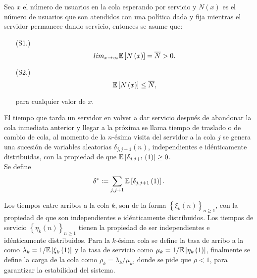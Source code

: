 Sea $x$ el n\'umero de usuarios en la cola esperando por servicio
y $N\left(x\right)$ es el n\'umero de usuarios que son atendidos
con una pol\'itica dada y fija mientras el servidor permanece
dando servicio, entonces se asume que:
\begin{itemize}
\item[(S1.)]
\begin{equation}\label{S1}
lim_{x\rightarrow\infty}\mathbb{E}\left[N\left(x\right)\right]=\overline{N}>0.
\end{equation}
\item[(S2.)]
\begin{equation}\label{S2}
\mathbb{E}\left[N\left(x\right)\right]\leq \overline{N},
\end{equation}

para cualquier valor de $x$.
\end{itemize}

El tiempo que tarda un servidor en volver a dar servicio despu\'es
de abandonar la cola inmediata anterior y llegar a la pr\'oxima se
llama tiempo de traslado o de cambio  de cola, al momento de la
$n$-\'esima visita del servidor a la cola $j$ se genera una
sucesi\'on de variables aleatorias $\delta_{j,j+1}\left(n\right)$,
independientes e id\'enticamente distribuidas, con la propiedad de
que $\mathbb{E}\left[\delta_{j,j+1}\left(1\right)\right]\geq0$.\\


Se define
\begin{equation}
\delta^{*}:=\sum_{j,j+1}\mathbb{E}\left[\delta_{j,j+1}\left(1\right)\right].
\end{equation}

Los tiempos entre arribos a la cola $k$, son de la forma
$\left\{\xi_{k}\left(n\right)\right\}_{n\geq1}$, con la propiedad
de que son independientes e id\'enticamente distribuidos. Los
tiempos de servicio
$\left\{\eta_{k}\left(n\right)\right\}_{n\geq1}$ tienen la
propiedad de ser independientes e id\'enticamente distribuidos.
Para la $k$-\'esima cola se define la tasa de arribo a la como
$\lambda_{k}=1/\mathbb{E}\left[\xi_{k}\left(1\right)\right]$ y la tasa
de servicio como
$\mu_{k}=1/\mathbb{E}\left[\eta_{k}\left(1\right)\right]$, finalmente se
define la carga de la cola como $\rho_{k}=\lambda_{k}/\mu_{k}$,
donde se pide que $\rho<1$, para garantizar la estabilidad del sistema.\\

